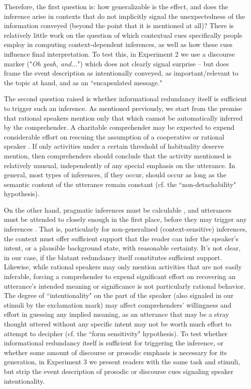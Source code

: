 \documentclass{sp}\usepackage[]{graphicx}\usepackage[]{color}
\begin{document}
Therefore, the first question is: how generalizable is the effect, and does the inference arise in contexts that do not implicitly signal the unexpectedness of the information conveyed (beyond the point that it is mentioned at all)? There is relatively little work on the question of which contextual cues specifically people employ in computing context-dependent inferences, as well as how these cues influence final interpretation. To test this, in Experiment 2 we use a discourse marker ("\textit{Oh yeah, and...}") which does not clearly signal surprise -- but does frame the event description as intentionally conveyed, as important/relevant to the topic at hand, and as an ``encapsulated message." 

The second question raised is whether informational redundancy itself is sufficient to trigger such an inference. As mentioned previously, we start from the premise that rational speakers mention only that which cannot be automatically inferred by the comprehender. A charitable comprehender may be expected to expend considerable effort on rescuing the assumption of a cooperative or rational speaker \citep{Davidson1974}. If only activities under a certain threshold of habituality deserve mention, then comprehenders should conclude that the activity mentioned is relatively unusual, independently of any special emphasis on the utterance.  In general, most types of inferences, if they occur, should occur as long as the semantic content of the utterance remain constant (cf. the ``non-detachability" hypothesis).

On the other hand, pragmatic inferences must be calculable \citep{Levinson2000}, and utterances must be attended to closely enough in the first place, before they may trigger any inferences \citep{Wilson2004}. That is, particularly for non-generalized (context-sensitive) inferences, the context must offer sufficient support that the reader can infer the speaker's intent, or a plausible background state, with reasonable certainty.  It's not clear, in our case, if the blatant redundancy itself constitutes sufficient support. Likewise, while rational speakers may only mention activities that are not easily inferable, forcing a comprehender to expend significant effort on recovering an utterance's intended meaning or significance is not particularly rational behavior. The degree of ``intentionality" on the part of the speaker (also signaled in our stimuli by the exclamation mark) may affect comprehenders' willingness and effort in guessing any implied meaning, as an utterance that may be a stray thought uttered without any specific intent may not be worth much effort to attempt to decipher (cf. the ``form sensitivity" hypothesis). To test whether informational redundancy itself is sufficient for triggering the inference, or whether some amount of discourse or prosodic emphasis is necessary for its generation, in Experiment 3 we present readers with the same task and stimuli, but strip the event description of prosodic or discourse cues signaling speaker intentionality.
\end{document}
